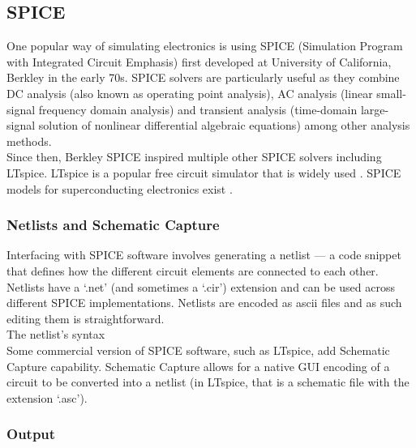 \documentclass{article}
\newcommand{\ccf}[1]{`\textsf{#1}'}
\begin{document}



\subsection{SPICE}

One popular way of simulating electronics is using SPICE 
(Simulation Program with Integrated Circuit Emphasis) first developed
at University of California, Berkley in the early 70s. 
SPICE solvers are particularly useful as they combine DC analysis (also known as
operating point analysis), AC analysis (linear small-signal frequency domain analysis) and 
transient analysis (time-domain large-signal solution of nonlinear differential algebraic equations)
among other analysis methods.\\

Since then, Berkley SPICE
inspired multiple other SPICE solvers including LTspice.
 
LTspice is a popular free circuit simulator that is widely used . SPICE models for 
superconducting electronics exist . 

\subsubsection{Netlists and Schematic Capture}

Interfacing with SPICE software involves generating a netlist --- a code snippet that defines
how the different circuit elements are connected to each other. Netlists have a \ccf{.net} (and 
sometimes a \ccf{.cir}) extension and can be used across different SPICE implementations. 
Netlists are encoded as ascii files and as such editing them is straightforward.\\

The netlist's syntax \\

Some commercial version of SPICE
software, such as LTspice, add Schematic Capture capability. Schematic Capture allows for a
native GUI encoding of a circuit to be converted into a netlist (in LTspice, that is a 
schematic file with the extension \ccf{.asc}).\\

\subsubsection{Output}
\end{document}
